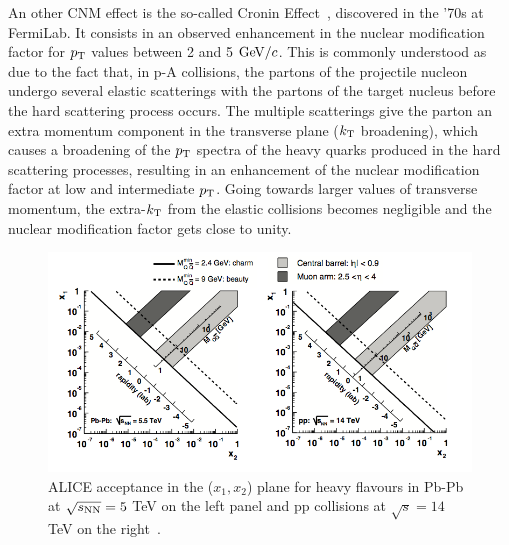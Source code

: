 An other CNM effect is the so-called Cronin Effect~\cite{Cronin:1974zm}, 
discovered in the '70s at FermiLab. It consists in an observed 
enhancement in the nuclear modification factor for $p_{\rm T}$ 
values between 2 and 5 $\mathrm{GeV}/c$. This is commonly understood as due to 
the fact that, in p-A collisions, the 
partons of the projectile nucleon undergo several elastic 
scatterings with the partons of the target nucleus before the hard scattering process 
occurs. The multiple scatterings give the parton an extra 
momentum component in the transverse plane ($k_{\rm T}$ broadening), 
which causes a broadening of the $p_{\rm T}$ spectra of the heavy 
quarks produced in the hard scattering processes,  
resulting in an enhancement of the nuclear modification factor at 
low and intermediate $p_{\rm T}$. Going towards 
larger values of transverse momentum, the extra-$k_{\rm T}$ 
from the elastic collisions becomes negligible and the nuclear 
modification factor gets close to unity.\\
\begin{figure}[!ht]
  \centering
  \includegraphics[width=15cm]{FigCap2/xBjork.png}
  \caption{ALICE acceptance in the ($x_1, x_2$) plane for heavy flavours in Pb-Pb at $\sqrt{s_{\rm NN}} = 5$ TeV on the left panel and pp collisions at $\sqrt{s} = 14$ TeV on the right~\cite{Alessandro:2006yt}. }
  \label{fig:xBjork}
\end{figure}



